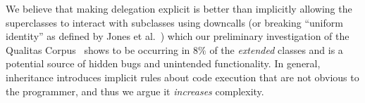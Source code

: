 \documentclass[preprint,10pt]{sigplanconf}
\begin{document}
We believe that making delegation explicit is better than implicitly
allowing the superclasses to interact with subclasses using downcalls (or breaking ``uniform identity'' as defined by Jones et al.~\cite{jones:2016:inheritance}) which our preliminary investigation of the Qualitas Corpus~\cite{QualitasCorpus:APSEC:2010} shows to be occurring in $8\%$ of the \textit{extended} classes and is a potential source of hidden bugs and unintended functionality. In general, inheritance introduces implicit rules about code execution that are not obvious to the programmer, and thus we argue it \textit{increases} complexity.






\end{document}
